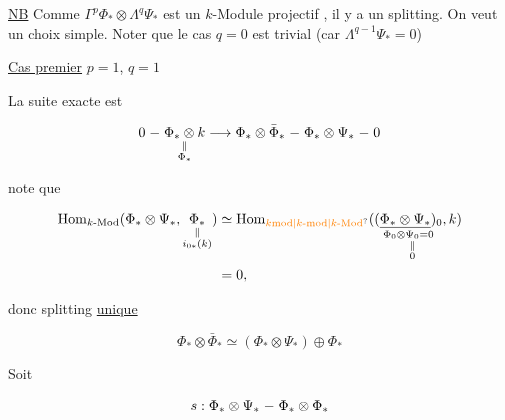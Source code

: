 
\uline{NB} Comme $\Gamma^p\Phi_*\otimes\Lambda^q\Psi_*$ est un $k$-Module projectif , il y a un splitting. On veut un choix simple. Noter que le cas $q=0$ est trivial (car $\Lambda^{q-1}\Psi_*=0$)

\uline{Cas premier} $p=1$, $q=1$

La suite exacte est

\[
0\relbar\underset{\substack{\Vert\\\Phi_*}}{\Phi_*\otimes k}\longrightarrow\Phi_*\otimes\bar\Phi_*\relbar\Phi_*\otimes\Psi_*\relbar0
\]

 note que

\[
\begin{aligned}
\operatorname{Hom}_{k\text{-Mod}}(\Phi_*\otimes\Psi_*,\underset{\substack{\Vert\\i_{0*}(k)}}{\Phi_*})
 &\simeq\operatorname{Hom}_{\unsure{k\mathrm{mod}|k\text{-mod}|k\text{-Mod}}}(\underset{\Phi_0\otimes\underset{\substack{\Vert\\0}}{\Psi_0}=0}{(\underline{\Phi_*\otimes\Psi_*})_0},k)\\
 &=0,
\end{aligned}
\]

donc splitting \uline{unique}

\[
\Phi_*\otimes\bar\Phi_*\simeq(\Phi_*\otimes\Psi_*)\oplus\Phi_*
\]

Soit 

\[
s:\Phi_*\otimes\Psi_*\relbar\Phi_*\otimes\Phi_*
\]

